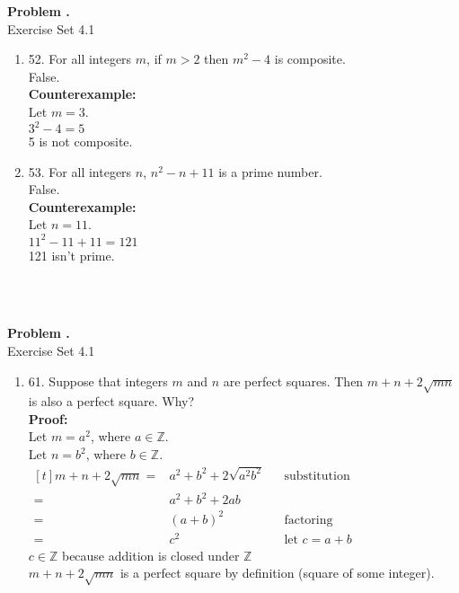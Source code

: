 \documentclass[letterpaper,fleqn]{article}
\begin{document}
	\newcommand{\set}[1]{Exercise Set 4.#1}
	
	\setcounter{pcount}{1}
	
	\newcommand{\problem}[2]{
		\noindent\begin{minipage}{\textwidth}
			\textbf{Problem \thepcount\stepcounter{pcount}.} \\
			Exercise Set 4.#1
			\begin{enumerate}
				#2
			\end{enumerate}
		\end{minipage} \\
		\\
	}
	
	\newcommand{\case}[2]{\cellcolor{yellow!25}\textbf{Case #1:} #2}
	\newcommand{\theorem}[2]{
		\cellcolor{green!25}\textbf{Theorem #1:} \\
		\hline
		#2
	}
	
		\problem{1}{
		\item [52.]
		For all integers $m$, if $m>2$ then $m^2-4$ is composite. \\
		False. \\
		\textbf{Counterexample:} \\
		Let $m=3$. \\
		$3^2-4=5$ \\
		5 is not composite.
		
		\item [53.]
		For all integers $n$, $n^2-n+11$ is a prime number. \\
		False. \\
		\textbf{Counterexample:} \\
		Let $n=11$. \\
		$11^2-11+11=121$ \\
		121 isn't prime.
		}
		
		\problem{1}{
		\item [61.]
		Suppose that integers $m$ and $n$ are perfect squares. Then $m+n+2\sqrt{mn}$ is also a perfect square. Why? \\
		\textbf{Proof:} \\
		Let $m=a^2$, where $a \in \mathbb{Z}$. \\
		Let $n=b^2$, where $b \in \mathbb{Z}$. \\
		$\begin{aligned}[t]
			m+n+2\sqrt{mn} ={} & a^2+b^2+2\sqrt{a^2b^2}  && \text{substitution} \\
			={} & a^2+b^2+2ab \\
			={} & (a+b)^2 && \text{factoring} \\
			={} & c^2 && \text{let $c=a+b$}
		\end{aligned}$ \\
		$c \in \mathbb{Z}$ because addition is closed under $\mathbb{Z}$ \\
		$m+n+2\sqrt{mn}$ is a perfect square by definition (square of some integer).
		}
		
\end{document}
